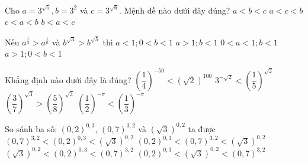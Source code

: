 \begin{ex}%
	Cho $a=3^{\sqrt{5}}, b=3^2$ và $c=3^{\sqrt{6}}$. Mệnh đề nào dưới  đây đúng?
	\choice 
		 {$a<b<c$}
		{$a<c<b$} 
		{$c<a<b$} 
		 {\True $b<a<c$}
\end{ex}

\begin{ex}%
	Nếu $a^{\frac{1}{3}}>a^{\frac{1}{6}}$ và $b^{\sqrt 3}>b^{\sqrt 5}$ thì 
	\choice 
		{$  a<1;0<b<1$}
		{$  a>1;b<1$}
		{$0<a<1;b<1$} 
		{\True $  a>1;0<b<1$}
\end{ex}

\begin{ex}%
	Khẳng định nào dưới đây là  đúng?
	 \choice
		{$\left(\dfrac{1}{4}\right)^{-50}  < (\sqrt{2})^{100}$}
		{$3^{-\sqrt{2}} <  \left(\dfrac{1}{5}\right)^{\sqrt{2}}$}
		{$\left(\dfrac{3}{7}\right)^{\sqrt{3}} > \left(\dfrac{5}{8}\right)^{\sqrt{3}}$} 
		{\True $\left(\dfrac{1}{2}\right)^{-\pi} < \left(\dfrac{1}{3}\right)^{-\pi}$} 
\end{ex}

\begin{ex}%
	So sánh ba số: $\left(0,2\right)^{0,3}$, $\left(0,7\right)^{3,2}$ và  $\left(\sqrt 3\right) ^{0,2}$ ta được
	 \choice
		{\True $\left(0,7\right)^{3,2}<\left(0,2\right)^{0,3}<\left(\sqrt  3\right)^{0,2}$}
		{$\left(0,2\right)^{0,3}<\left(0,7\right)^{3,2}<\left(\sqrt 3\right)^{0,2}$} 
		{$\left(\sqrt 3\right)  ^{0,2}<\left(0,2\right)^{0,3}<\left(0,7\right)^{3,2}$}
		{$\left(0,2\right)^{0,3}<\left(\sqrt  3\right)^{0,2}<\left(0,7\right)^{3,2}$}
\end{ex}

